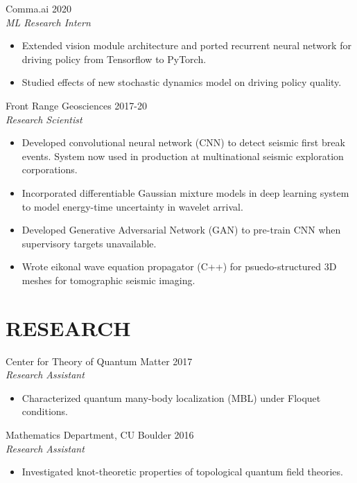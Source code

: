 \documentclass[margin]{res}
\begin{document}
\begin{resume}
                 Comma.ai \hfill            2020 \\
		{\sl ML Research Intern}
                 \begin{itemize}  \itemsep -2pt %
                 \item Extended	vision module architecture and ported recurrent
                   neural network for driving policy from Tensorflow to PyTorch.
                 \item Studied effects of new stochastic dynamics model on driving
                   policy quality.
                 \end{itemize}

 
               Front Range Geosciences \hfill            2017-20 \\
                 {\sl Research Scientist}
                 \begin{itemize}  \itemsep -2pt %
                 \item Developed convolutional neural network (CNN) to detect
                   seismic first break events. System now used in production at
                   multinational seismic exploration corporations.
                 \item Incorporated differentiable Gaussian mixture models in
                   deep learning system to model energy-time uncertainty in
                   wavelet arrival.
                 \item Developed Generative Adversarial Network (GAN) to pre-train
                   CNN when supervisory targets unavailable.
                 \item Wrote eikonal wave equation propagator (C++) for
                   psuedo-structured 3D meshes for tomographic seismic imaging.
                 \end{itemize} 
\section{RESEARCH} Center for Theory of Quantum Matter \hfill            2017 \\
		{\sl Research Assistant}
                 \begin{itemize}  \itemsep -2pt %
                 \item Characterized quantum many-body localization (MBL) under Floquet conditions.
                 \end{itemize}

                Mathematics Department, CU Boulder \hfill            2016 \\
		 {\sl Research Assistant}
                 \begin{itemize}  \itemsep -2pt %
                 \item Investigated knot-theoretic properties of topological quantum field theories.
                 \end{itemize}


\end{resume}
\end{document}
